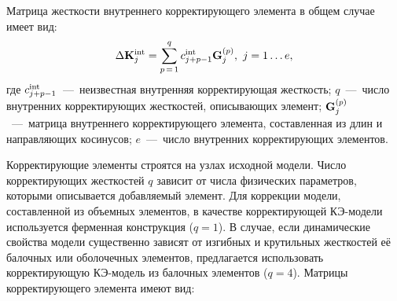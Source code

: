 Матрица жесткости внутреннего корректирующего элемента в общем случае имеет вид:
\begin{equation}
	\Delta \mathbf{K} ^ {\text{int}}_j = \sum\limits_{p\,=\,1}^{q} c ^ {\text{int}}_{j+p-1} \mathbf{G}_j^{(p)}, \ j = 1 \hdots e, \label{eq:internalStiffMatrix}
\end{equation}
где $ c ^ {\text{int}}_{j+p-1} $~---~неизвестная внутренняя корректирующая жесткость; $ q $~---~число внутренних корректирующих жесткостей, описывающих элемент; $ \mathbf{G}_j^{(p)} $~---~матрица внутреннего корректирующего элемента, составленная из длин и направляющих косинусов; $ e $~---~число внутренних корректирующих элементов. 

Корректирующие элементы строятся на узлах исходной модели. Число корректирующих жесткостей $ q $ зависит от числа физических параметров, которыми описывается добавляемый элемент. Для коррекции модели, составленной из объемных элементов, в качестве корректирующей КЭ-модели используется ферменная конструкция ($ q = 1 $). В случае, если динамические свойства модели существенно зависят от изгибных и крутильных жесткостей её балочных или оболочечных элементов, предлагается использовать корректирующую КЭ-модель из балочных элементов ($ q = 4 $). Матрицы корректирующего элемента имеют вид:
